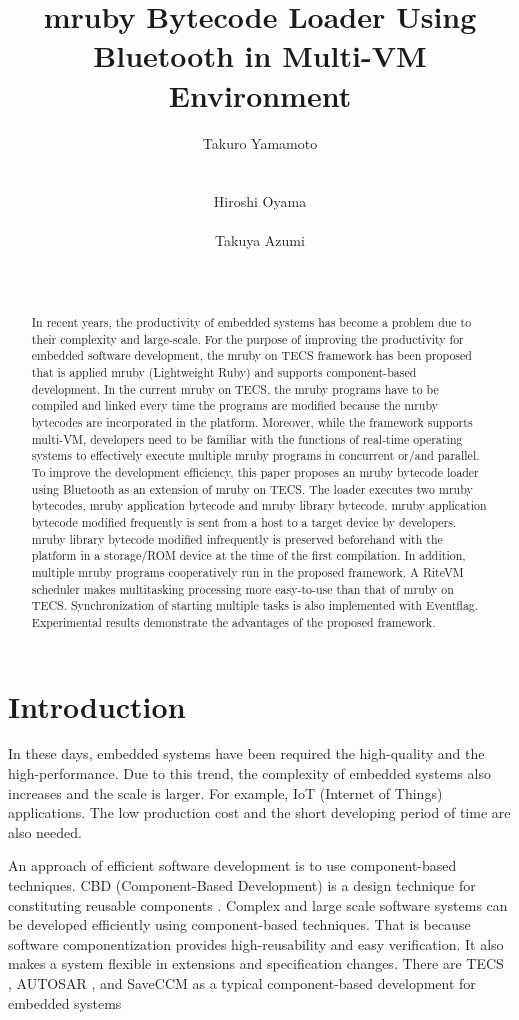 \documentclass{sig-alternate-05-2015}
\title{mruby Bytecode Loader Using Bluetooth in Multi-VM Environment}
\author{
\alignauthor
Takuro Yamamoto\\
    \affaddr{Graduate School of Engineering Science, Osaka University}\\
    \affaddr{Osaka, JAPAN}\\
\alignauthor
Hiroshi Oyama\\
    \affaddr{OKUMA Corporation}\\
    \affaddr{Aichi, JAPAN}
\alignauthor
Takuya Azumi\\
    \affaddr{Graduate School of Engineering Science, Osaka University}\\
    \affaddr{Osaka, JAPAN}\\
}
\begin{document}
\maketitle
\begin{abstract}
In recent years, the productivity of embedded systems has become a problem due to their complexity and large-scale.
For the purpose of improving the productivity for embedded software development, the mruby on TECS framework has been proposed that is applied mruby (Lightweight Ruby) and supports component-based development.
In the current mruby on TECS, the mruby programs have to be compiled and linked every time the programs are modified because the mruby bytecodes are incorporated in the platform.
Moreover, while the framework supports multi-VM, developers need to be familiar with the functions of real-time operating systems to effectively execute multiple mruby programs in concurrent or/and parallel.
To improve the development efficiency, this paper proposes an mruby bytecode loader using Bluetooth as an extension of mruby on TECS.
The loader executes two mruby bytecodes, mruby application bytecode and mruby library bytecode.
mruby application bytecode modified frequently is sent from a host to a target device by developers.
mruby library bytecode modified infrequently is preserved beforehand with the platform in a storage/ROM device at the time of the first compilation.
In addition, multiple mruby programs cooperatively run in the proposed framework.
A RiteVM scheduler makes multitasking processing more easy-to-use than that of mruby on TECS.
Synchronization of starting multiple tasks is also implemented with Eventflag. 
Experimental results demonstrate the advantages of the proposed framework.
\end{abstract}

\section{Introduction}
In these days, embedded systems have been required the high-quality and the high-performance.
Due to this trend, the complexity of embedded systems also increases and the scale is larger.
For example, IoT (Internet of Things) applications.
The low production cost and the short developing period of time are also needed.

An approach of efficient software development is to use component-based techniques.
CBD (Component-Based Development) is a design technique for constituting reusable components \cite{par:Crnkovic}.
Complex and large scale software systems can be developed efficiently using component-based techniques.
That is because software componentization provides high-reusability and easy verification.
It also makes a system flexible in extensions and specification changes.
There are TECS \cite{par:TECS}, AUTOSAR \cite{url:AUTOSAR}, and SaveCCM \cite{par:SAVEapproach} as a typical component-based development for embedded systems 
\end{document}
